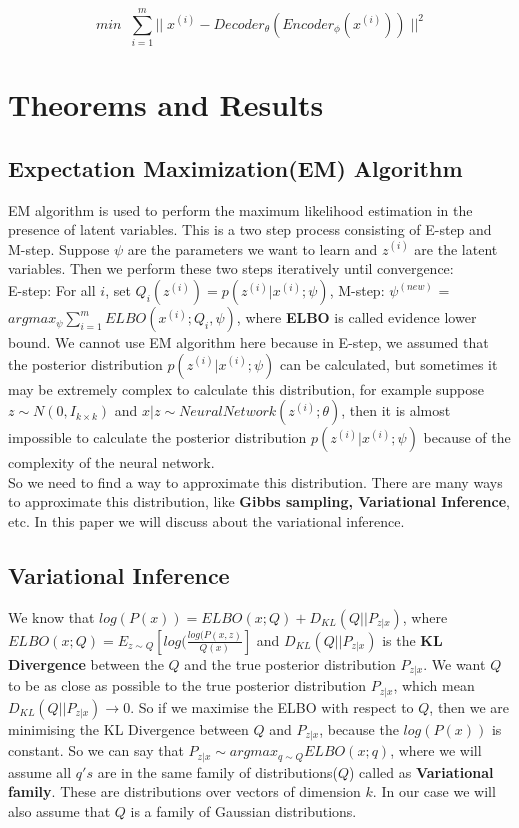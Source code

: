 \documentclass[10pt,a4paper]{article}
\begin{document}
\[
  min \;\; \sum_{i=1}^{m} ||\;  x^{(i)} - Decoder_{\theta}(Encoder_{\phi}(x^{(i)})) \; ||^2
\]

\section{Theorems and Results}
\subsection{Expectation Maximization(EM) Algorithm}
EM algorithm is used to perform the maximum likelihood estimation in the presence of latent variables. This is a two step process consisting of E-step and M-step. Suppose $\psi$ are the parameters we want to learn and $z^{(i)}$ are the latent variables. Then we perform these two steps iteratively until convergence: \\
E-step: For all $i$, set $Q_i(z^{(i)}) = p(z^{(i)}|x^{(i)}; \psi)$, M-step: $\psi^{(new)}$ = $argmax_{\psi} \sum_{i=1}^{m} ELBO(x^{(i)};Q_i,\psi)$, where \textbf{ELBO} is called evidence lower bound. We cannot use EM algorithm here because in E-step, we assumed that the posterior distribution $p(z^{(i)}|x^{(i)}; \psi)$  can be calculated, but sometimes it may be extremely complex to calculate this distribution, for example suppose $z \sim N(0,I_{k \times k})$ and $x | z \sim NeuralNetwork(z^{(i)};\theta)$, then it is almost impossible to calculate the posterior distribution $p(z^{(i)}|x^{(i)}; \psi)$ because of the complexity of the neural network.
\\ So we need to find a way to approximate this distribution. There are many ways to approximate this distribution, like \textbf{Gibbs sampling, Variational Inference}, etc. In this paper we will discuss about the variational inference.

\subsection{Variational Inference}
We know that $log(P(x)) = ELBO(x;Q) + D_{KL}(Q || P_{z|x})$, where $ELBO(x;Q) = E_{z \sim Q} [log(\frac{log(P(x,z)}{Q(x)}]$ and $D_{KL}(Q || P_{z|x})$ is the \textbf{KL Divergence} between the $Q$ and the true posterior distribution $P_{z|x}$. We want $Q$ to be as close as possible to the true posterior distribution $P_{z|x}$, which mean $D_{KL}(Q || P_{z|x}) \longrightarrow 0$. So if we maximise the ELBO with respect to $Q$, then we are minimising the KL Divergence between $Q$ and $P_{z|x}$, because the $log(P(x))$ is constant. So we can say that $P_{z|x} \sim argmax_{q \sim Q} ELBO(x;q)$, where we will assume all $q's$ are in the same family of distributions($Q$) called as \textbf{Variational family}. These are distributions over vectors of dimension $k$. In our case we will also assume that $Q$ is a family of Gaussian distributions.
\end{document}
